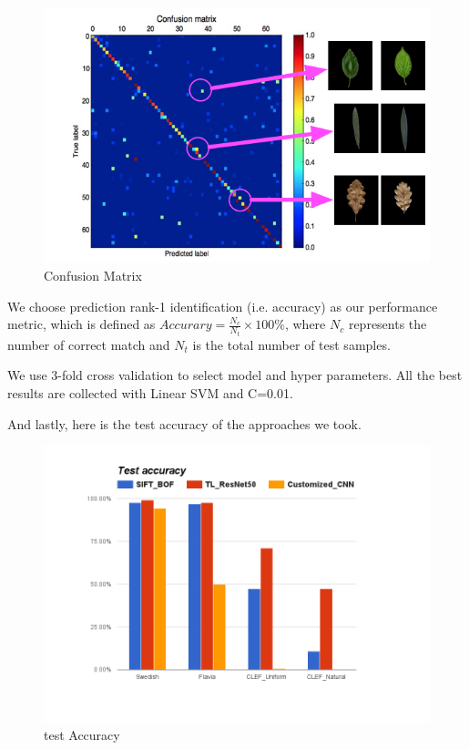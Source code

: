 \documentclass[journal, 10pt]{IEEEtran}
\begin{document}
\begin{figure}[H]
  \centering
  \includegraphics[width=1.00\linewidth]{best_cm_uniform}
  \caption{ Confusion Matrix }
  \label{fig:best_cm_uniform}
\end{figure}

We choose prediction rank-1 identification (i.e. accuracy) as our performance metric, which is defined as $Accurary = \frac{N_c}{N_t} \times 100 \%$, where $N_c$ represents the number of correct match and $N_t$ is the total number of test samples.

We use 3-fold cross validation to select model and hyper parameters. All the best results are collected with Linear SVM and C=0.01.

And lastly, here is the test accuracy of the approaches we took.
\begin{figure}[H]
  \centering
  \includegraphics[width=1.00\linewidth]{test_accuracy_with_customized_cnn}
  \caption{ test Accuracy }
  \label{fig:test_accuracy}
\end{figure}
\end{document}
